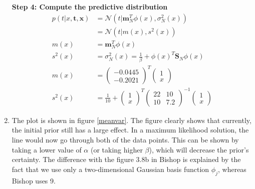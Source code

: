 \documentclass[paper=a4, fontsize=10pt]{scrartcl} %
\numberwithin{equation}{section} %
\numberwithin{figure}{section} %
\numberwithin{table}{section} %
\begin{document}
\begin{enumerate}
			\textbf{Step 4: Compute the predictive distribution}
			\begin{align}
				p(t \vert x, \boldsymbol t, \boldsymbol x) &= \mathcal{N}(t \vert \boldsymbol m_N^T \phi(x), \sigma^2_N(x))\\
														   &= \mathcal{N}(t \vert m(x), s^2(x))\\
				m(x) &= \boldsymbol m_N^T\phi(x) \\
				s^2(x) &= \sigma^2_N(x) = \frac{1}{\beta} + \phi(x)^T \boldsymbol S_N \phi(x)\\
				m(x) &= \begin{pmatrix}
							-0.0445\\
							-0.2021
						\end{pmatrix}^T
						\begin{pmatrix}
							1\\
							x
						\end{pmatrix}\\
				s^2(x) &= \frac{1}{10} + \begin{pmatrix}
											1\\
											x
										 \end{pmatrix}^T
										 \begin{pmatrix}
										 	22 & 10\\
										 	10 & 7.2
										 \end{pmatrix}^{-1}
										 \begin{pmatrix}
										 	1\\
										 	x
										 \end{pmatrix}
			\end{align}
	\item The plot is shown in figure \ref{meanvar}. The figure clearly shows that currently, the initial prior still has a large effect. In a maximum likelihood solution, the line would now go through both of the data points. This can be shown by taking a lower value of $\alpha$ (or taking higher $\beta$), which will decrease the prior's certainty. The difference with the figure 3.8b in Bishop is explained by the fact that we use only a two-dimensional Gaussian basis function $\phi_j$, whereas Bishop uses 9.


\end{enumerate}
\end{document}
